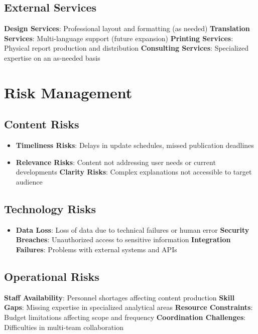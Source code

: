 \documentclass[11pt,a4paper]{article}
\begin{document}
\subsection{External Services}
\begin{itemize}
    \textbf{Design Services}: Professional layout and formatting (as needed)
    \textbf{Translation Services}: Multi-language support (future expansion)
    \textbf{Printing Services}: Physical report production and distribution
    \textbf{Consulting Services}: Specialized expertise on an as-needed basis
\end{itemize}

\section{Risk Management}

\subsection{Content Risks}
\begin{itemize}
    \textbf{Accuracy Risks}: Data errors, calculation mistakes, misinterpretation
    \item \textbf{Timeliness Risks}: Delays in update schedules, missed publication deadlines
    \item \textbf{Relevance Risks}: Content not addressing user needs or current developments
    \textbf{Clarity Risks}: Complex explanations not accessible to target audience
\end{itemize}

\subsection{Technology Risks}
\begin{itemize}
    \textbf{Platform Downtime}: System failures affecting access to reports
    \item \textbf{Data Loss}: Loss of data due to technical failures or human error
    \textbf{Security Breaches}: Unauthorized access to sensitive information
    \textbf{Integration Failures}: Problems with external systems and APIs
\end{itemize}

\subsection{Operational Risks}
\begin{itemize}
    \textbf{Staff Availability}: Personnel shortages affecting content production
    \textbf{Skill Gaps}: Missing expertise in specialized analytical areas
    \textbf{Resource Constraints}: Budget limitations affecting scope and frequency
    \textbf{Coordination Challenges}: Difficulties in multi-team collaboration
\end{itemize}
\end{document}
